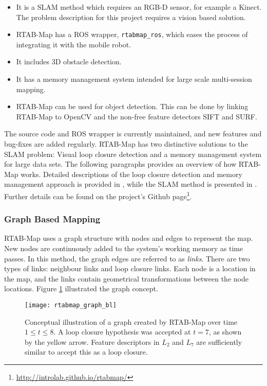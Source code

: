 \begin{itemize}
	\item It is a \ac{SLAM} method which requires an RGB-D sensor, for example a Kinect. The problem description for this project requires a vision based solution.
	\item \ac{RTAB-Map} has a \ac{ROS} wrapper, \texttt{rtabmap\_ros}, which eases the process of integrating it with the mobile robot.
	\item It includes 3D obstacle detection.
	\item It has a memory management system intended for large scale multi-session mapping.
	\item \ac{RTAB-Map} can be used for object detection. This can be done by linking \ac{RTAB-Map} to OpenCV and the non-free feature detectors \ac{SIFT} and \ac{SURF}.
\end{itemize}

The source code and \ac{ROS} wrapper is currently maintained, and new features and bug-fixes are added regularly. \ac{RTAB-Map} has two distinctive solutions to the \ac{SLAM} problem: Visual loop closure detection and a memory management system for large data sets. The following paragraphs provides an overview of how \ac{RTAB-Map} works. Detailed descriptions of the loop closure detection and memory management approach is provided in  \cite{labbe13appearance}, while the \ac{SLAM} method is presented in \cite{labbe14online}. Further details can be found on the project's Github page\footnote{\url{http://introlab.github.io/rtabmap/}}.

\subsubsection{Graph Based Mapping}

\ac{RTAB-Map} uses a graph structure with nodes and edges to represent the map. New nodes are continuously added to the system's working memory as time passes. In this method, the graph edges are referred to as \textit{links}. There are two types of links: neighbour links and loop closure links. Each node is a location in the map, and the links contain geometrical transformations between the node locations. Figure \ref{fig:rtabmap_graph} illustrated the graph concept.

\begin{figure}[h]
    \centering
    \texttt{[image: rtabmap\_graph\_bl]}
    \caption{Conceptual illustration of a graph created by \ac{RTAB-Map} over time $1 \leq t \leq 8 $. A loop closure hypothesis was accepted at $t=7$, as shown by the yellow arrow. Feature descriptors in $L_2$ and $L_7$ are sufficiently similar to accept this as a loop closure.}
    \label{fig:rtabmap_graph}
\end{figure}

